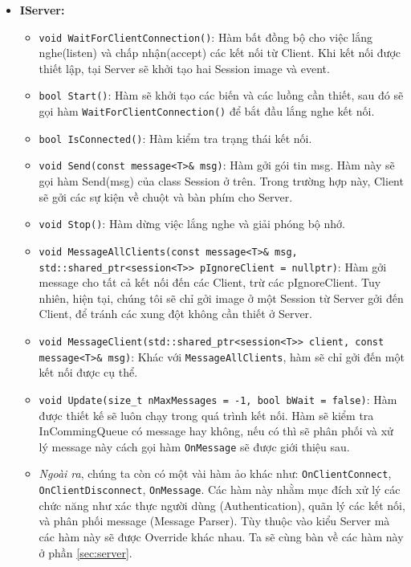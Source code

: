 \begin{itemize}
	\item \textbf{IServer: } 
	\begin{itemize}
		\item[] \lstinline{void WaitForClientConnection()}: Hàm bất đồng bộ cho việc lắng nghe(listen) và chấp nhận(accept) các kết nối từ Client. Khi kết nối được thiết lập, tại Server sẽ khởi tạo hai Session image và event.
		\item[] \lstinline{bool Start()}: Hàm sẽ khởi tạo các biến và các luồng cần thiết, sau đó sẽ gọi hàm \lstinline{WaitForClientConnection()} để bắt đầu lắng nghe kết nối.
		\item[] \lstinline{bool IsConnected()}: Hàm kiểm tra trạng thái kết nối.
		\item[] \lstinline{void Send(const message<T>& msg)}: Hàm gởi gói tin msg. Hàm này sẽ gọi hàm Send(msg) của class Session ở trên. Trong trường hợp này, Client sẽ gởi các sự kiện về chuột và bàn phím cho Server.
		\item[] \lstinline{void Stop()}: Hàm dừng việc lắng nghe và giải phóng bộ nhớ.
		\item[] \lstinline{void MessageAllClients(const message<T>& msg, std::shared_ptr<session<T>> pIgnoreClient = nullptr)}: Hàm gởi message cho tất cả kết nối đến các Client, trừ các pIgnoreClient. Tuy nhiên, hiện tại, chúng tôi sẽ chỉ gởi image ở một Session từ Server gởi đến Client, để tránh các xung đột không cần thiết ở Server.
		\item[] \lstinline{void MessageClient(std::shared_ptr<session<T>> client, const message<T>& msg)}: Khác với \lstinline{MessageAllClients}, hàm sẽ chỉ gởi đến một kết nối được cụ thể.
		\item[] \lstinline{void Update(size_t nMaxMessages = -1, bool bWait = false)}: Hàm được thiết kế sẽ luôn chạy trong quá trình kết nối. Hàm sẽ kiểm tra InCommingQueue có message hay không, nếu có thì sẽ phân phối và xử lý message này cách gọi hàm \lstinline{OnMessage} sẽ được giới thiệu sau.
		
		\item[] \textit{Ngoài ra}, chúng ta còn có một vài hàm ảo khác như: \lstinline{OnClientConnect}, \\ \lstinline{OnClientDisconnect}, \lstinline{OnMessage}. Các hàm này nhằm mục đích xử lý các chức năng như xác thực người dùng (Authentication), quãn lý các kết nối, và phân phối message (Message Parser). Tùy thuộc vào kiểu Server mà các hàm này sẽ được Override khác nhau. Ta sẽ cùng bàn về các hàm này ở phần \ref{sec:server}.
		
	\end{itemize}
\end{itemize}

